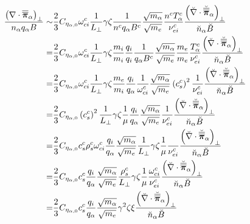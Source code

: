 \begin{align*}
    \frac{\left(\nabla\cdot\boldsymbol{\overline{\overline{\pi}}}_\alpha\right)_\perp}{n_\alpha q_\alpha B}
    \sim&
    \frac{2}{3}
    C_{\eta_{\alpha,0}}
     \omega^c_{ci}
     \frac{1}{L_\perp}
     \gamma
     \zeta
     \frac{1}{n^c q_\alpha B^c}
     \frac{\sqrt{m_\alpha}}{\sqrt{m_e}}
     \frac{n^c T^c_\alpha}{\nu^c_{ei}}
     \frac{ \left(\breve{\nabla}\cdot\breve{\boldsymbol{\overline{\overline{\pi}}}}_\alpha\right)_\perp }{\breve{n}_\alpha \breve{B}}
     \\
     =&
    \frac{2}{3}
    C_{\eta_{\alpha,0}}
     \omega^c_{ci}
     \frac{1}{L_\perp}
     \gamma
     \zeta
     \frac{m_i}{m_i}
     \frac{q_i}{q_i}
     \frac{1}{q_\alpha B^c}
     \frac{\sqrt{m_\alpha}}{\sqrt{m_e}}
     \frac{m_e}{m_e}
     \frac{T^c_\alpha}{\nu^c_{ei}}
     \frac{ \left(\breve{\nabla}\cdot\breve{\boldsymbol{\overline{\overline{\pi}}}}_\alpha\right)_\perp }{\breve{n}_\alpha \breve{B}}
     \\
     =&
    \frac{2}{3}
    C_{\eta_{\alpha,0}}
     \omega^c_{ci}
     \frac{1}{L_\perp}
     \gamma
     \zeta
     \frac{m_e}{m_i}
     \frac{q_i}{q_\alpha}
     \frac{1}{\omega^c_{ci}}
     \frac{\sqrt{m_\alpha}}{\sqrt{m_e}}
     \left(c^c_s\right)^2
     \frac{1}{\nu^c_{ei}}
     \frac{ \left(\breve{\nabla}\cdot\breve{\boldsymbol{\overline{\overline{\pi}}}}_\alpha\right)_\perp }{\breve{n}_\alpha \breve{B}}
     \\
     =&
    \frac{2}{3}
    C_{\eta_{\alpha,0}}
    \left(c^c_s\right)^2
     \frac{1}{L_\perp}
     \gamma
     \zeta
     \frac{1}{\mu}
     \frac{q_i}{q_\alpha}
     \frac{\sqrt{m_\alpha}}{\sqrt{m_e}}
     \frac{1}{\nu^c_{ei}}
     \frac{ \left(\breve{\nabla}\cdot\breve{\boldsymbol{\overline{\overline{\pi}}}}_\alpha\right)_\perp }{\breve{n}_\alpha \breve{B}}
     \\
     =&
    \frac{2}{3}
    C_{\eta_{\alpha,0}}
     c^c_s
     \rho^c_s
     \omega^c_{ci}
     \frac{q_i}{q_\alpha}
     \frac{\sqrt{m_\alpha}}{\sqrt{m_e}}
     \frac{1}{L_\perp}
     \gamma
     \zeta
     \frac{1}{\mu}
     \frac{}{\nu^c_{ei}}
     \frac{ \left(\breve{\nabla}\cdot\breve{\boldsymbol{\overline{\overline{\pi}}}}_\alpha\right)_\perp }{\breve{n}_\alpha \breve{B}}
     \\
     =&
    \frac{2}{3}
    C_{\eta_{\alpha,0}}
     c^c_s
     \frac{q_i}{q_\alpha}
     \frac{\sqrt{m_\alpha}}{\sqrt{m_e}}
     \frac{\rho^c_s}{L_\perp}
     \gamma
     \zeta
     \frac{1}{\mu}
     \frac{\omega^c_{ci}}{\nu^c_{ei}}
     \frac{ \left(\breve{\nabla}\cdot\breve{\boldsymbol{\overline{\overline{\pi}}}}_\alpha\right)_\perp }{\breve{n}_\alpha \breve{B}}
     \\
     =&
    \frac{2}{3}
    C_{\eta_{\alpha,0}}
     c^c_s
     \frac{q_i}{q_\alpha}
     \frac{\sqrt{m_\alpha}}{\sqrt{m_e}}
     \gamma^2
     \zeta
     \xi
     \frac{ \left(\breve{\nabla}\cdot\breve{\boldsymbol{\overline{\overline{\pi}}}}_\alpha\right)_\perp }{\breve{n}_\alpha \breve{B}}
\end{align*}
%

